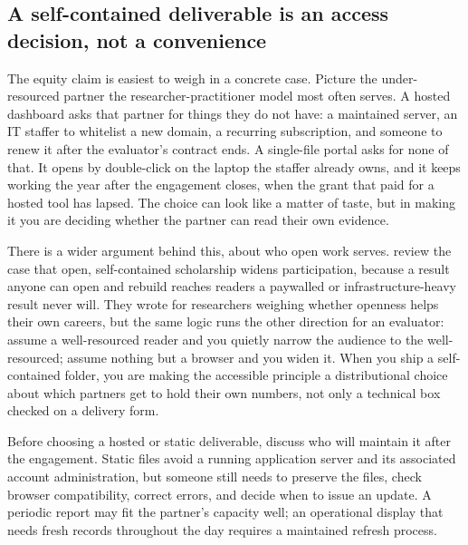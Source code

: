 \documentclass[
    a4paper,
    fontsize=10pt,
    twoside=true,
    numbers=noenddot,
]{kaobook}
\begin{document}
\subsection{A self-contained deliverable is an access decision, not a convenience}
The equity claim is easiest to weigh in a concrete case. Picture the under-resourced partner the researcher-practitioner model most often serves. A hosted dashboard asks that partner for things they do not have: a maintained server, an IT staffer to whitelist a new domain, a recurring subscription, and someone to renew it after the evaluator's contract ends. A single-file portal asks for none of that. It opens by double-click on the laptop the staffer already owns, and it keeps working the year after the engagement closes, when the grant that paid for a hosted tool has lapsed. The choice can look like a matter of taste, but in making it you are deciding whether the partner can read their own evidence.

There is a wider argument behind this, about who open work serves. \textcite{mckiernan2016open} review the case that open, self-contained scholarship widens participation, because a result anyone can open and rebuild reaches readers a paywalled or infrastructure-heavy result never will. They wrote for researchers weighing whether openness helps their own careers, but the same logic runs the other direction for an evaluator: assume a well-resourced reader and you quietly narrow the audience to the well-resourced; assume nothing but a browser and you widen it. When you ship a self-contained folder, you are making the accessible principle a distributional choice about which partners get to hold their own numbers, not only a technical box checked on a delivery form.

Before choosing a hosted or static deliverable, discuss who will maintain it after the engagement. Static files avoid a running application server and its associated account administration, but someone still needs to preserve the files, check browser compatibility, correct errors, and decide when to issue an update. A periodic report may fit the partner's capacity well; an operational display that needs fresh records throughout the day requires a maintained refresh process.
\end{document}
